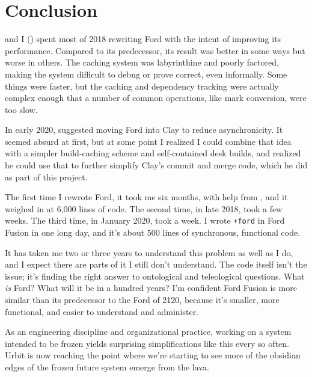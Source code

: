 \documentclass[twoside]{article}
\begin{document}
\section{Conclusion}

 and I () spent most of 2018 rewriting Ford with the intent of improving its performance. Compared to its predecessor, its result was better in some ways but worse in others. The caching system was labyrinthine and poorly factored, making the system difficult to debug or prove correct, even informally. Some things were faster, but the caching and dependency tracking were actually complex enough that a number of common operations, like mark conversion, were too slow.

In early 2020,  suggested moving Ford into Clay to reduce asynchronicity. It seemed absurd at first, but at some point I realized I could combine that idea with a simpler build-caching scheme and self-contained desk builds, and  realized he could use that to further simplify Clay’s commit and merge code, which he did as part of this project.

The first time I rewrote Ford, it took me six months, with help from , and it weighed in at 6,000 lines of code. The second time, in late 2018, took a few weeks. The third time, in January 2020, took a week. I wrote \lstinline[style=inlinecode]{+ford} in Ford Fusion in one long day, and it’s about 500 lines of synchronous, functional code.

It has taken me two or three years to understand this problem as well as I do, and I expect there are parts of it I still don’t understand. The code itself isn’t the issue; it’s finding the right answer to ontological and teleological questions. What \emph{is} Ford? What will it be in a hundred years? I’m confident Ford Fusion is more similar than its predecessor to the Ford of 2120, because it’s smaller, more functional, and easier to understand and administer.

As an engineering discipline and organizational practice, working on a system intended to be frozen yields surprising simplifications like this every so often. Urbit is now reaching the point where we’re starting to see more of the obsidian edges of the frozen future system emerge from the lava.\tombstone{}

\printbibliography
\end{document}
